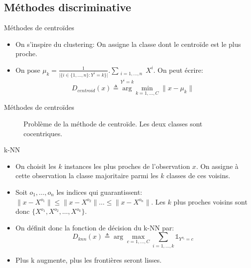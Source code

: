 \documentclass[8pt]{beamer}
\begin{document}
		\subsection{Méthodes discriminative}
			\begin{frame}{Méthodes de centroïdes}
				\begin{itemize}
					\item<1-> On s'inspire du clustering: On assigne la classe dont le centroïde est le plus proche.
					\item<2-> On pose \(\mu_k = \frac{1}{\vert \{i\in\{1,\dots,n\}: Y^i = k\} \vert}.\sum_{\substack{i=1,\dots,n\\Y^i = k}} X^i\). On peut écrire:
						\begin{equation}
							D_{centroid}(x) \triangleq \arg \min_{k=1,\dots,C} \lVert x - \mu_k \rVert
						\end{equation}
				\end{itemize}
			\end{frame}
			\begin{frame}{Méthodes de centroïdes}
				\begin{figure}[H]
					
					\caption*{Problème de la méthode de centroïde. Les deux classes sont cocentriques.}
				\end{figure}
			\end{frame}
			\begin{frame}{k-NN}
				\begin{itemize}
					\item<1-> On choisit les \(k\) instances les plus proches de l'observation \(x\). On assigne à cette observation la classe majoritaire parmi les \(k\) classes de ces voisins.
					\item<2-> Soit \(o_1,\dots,o_n\) les indices qui guarantissent: \(\lVert x - X^{o_1} \rVert \leq \lVert x - X^{o_2} \rVert \dots \leq \lVert x - X^{o_n} \rVert\). Les \(k\) plus proches voisins sont donc \(\{X^{o_1}, X^{o_2},\dots,X^{o_k}\}\).
					\item<3-> On définit donc la fonction de décision du k-NN par:
						\begin{equation}
							D_{knn}(x) \triangleq \arg \max_{c=1,\dots,C} \sum_{i=1,\dots,k} \mathbb{1}_{Y^{o_i} = c}
						\end{equation}
					\item<4-> Plus k augmente, plus les frontières seront lisses.
				\end{itemize}
			\end{frame}
\end{document}
